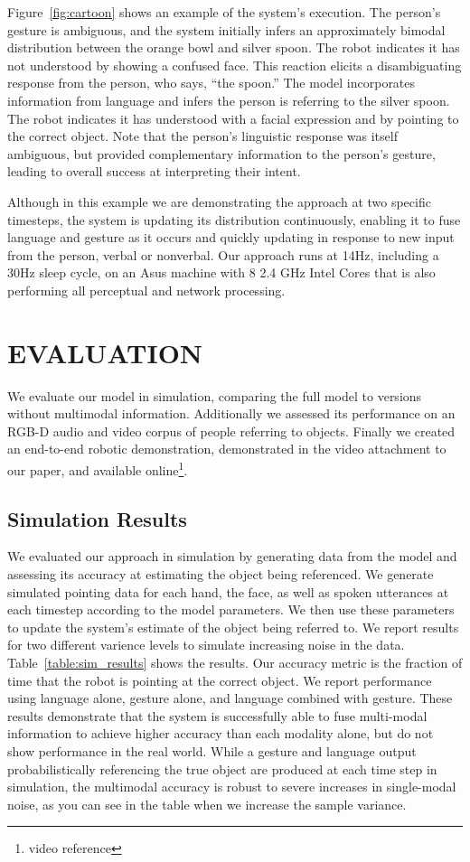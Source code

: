 \documentclass[letterpaper, 10 pt, conference]{ieeeconf}
\begin{document}
Figure~\ref{fig:cartoon} shows an example of the system's execution.
The person's gesture is ambiguous, and the system initially infers an
approximately bimodal distribution between the orange bowl and silver
spoon.  The robot indicates it has not understood by showing a
confused face.  This reaction elicits a disambiguating response from
the person, who says, ``the spoon.''  The model incorporates
information from language and infers the person is referring to the
silver spoon.  The robot indicates it has understood with a facial
expression and by pointing to the correct object.  Note that the
person's linguistic response was itself ambiguous, but provided
complementary information to the person's gesture, leading to overall
success at interpreting their intent.

Although in this example we are demonstrating the approach at two
specific timesteps, the system is updating its distribution
continuously, enabling it to fuse language and gesture as it occurs
and quickly updating in response to new input from the person, verbal
or nonverbal.  Our approach runs at 14Hz, including a 30Hz sleep
cycle, on an Asus machine with 8 2.4 GHz Intel Cores that is also
performing all perceptual and network processing. 

\section{EVALUATION}

We evaluate our model in simulation, comparing the full model to
versions without multimodal information.  Additionally we assessed its
performance on an RGB-D audio and video corpus of people referring to
objects.  Finally we created an end-to-end robotic demonstration,
demonstrated in the video attachment to our paper, and available
online\footnote{video reference}. 

\subsection{Simulation Results}

We evaluated our approach in simulation by generating data from the
model and assessing its accuracy at estimating the object being
referenced.  We generate simulated pointing data for each hand, the
face, as well as spoken utterances at each timestep according to the
model parameters.  We then use these parameters to update the system's
estimate of the object being referred to.  We report results for two
different varience levels to simulate increasing noise in the data.
Table~\ref{table:sim_results} shows the results.  Our accuracy metric
is the fraction of time that the robot is pointing at the correct
object.  We report performance using language alone, gesture alone,
and language combined with gesture.  These results demonstrate that
the system is successfully able to fuse multi-modal information to
achieve higher accuracy than each modality alone, but do not show
performance in the real world.  While a gesture and language output
probabilistically referencing the true object are produced at each
time step in simulation, the multimodal accuracy is robust to severe
increases in single-modal noise, as you can see in the table when we
increase the sample variance.
\end{document}
